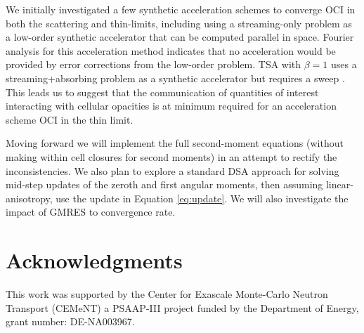We initially investigated a few synthetic acceleration schemes to converge OCI in both the scattering and thin-limits, including using a streaming-only problem as a low-order synthetic accelerator that can be computed parallel in space.
Fourier analysis for this acceleration method indicates that no acceleration would be provided by error corrections from the low-order problem.
TSA with $\beta=1$  uses a streaming+absorbing problem as a synthetic accelerator but requires a sweep \cite{tsa2009rosa}.
This leads us to suggest that the communication of quantities of interest interacting with cellular opacities is at minimum required for an acceleration scheme OCI in the thin limit.

Moving forward we will implement the full second-moment equations (without making within cell closures for second moments) in an attempt to rectify the inconsistencies.
We also plan to explore a standard DSA approach for solving mid-step updates of the zeroth and first angular moments, then assuming linear-anisotropy, use the update in Equation \ref{eq:update}.
We will also investigate the impact of GMRES to convergence rate.


\section*{Acknowledgments}

This work was supported by the Center for Exascale Monte-Carlo Neutron Transport (CEMeNT) a PSAAP-III project funded by the Department of Energy, grant number: DE-NA003967.